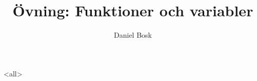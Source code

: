 \documentclass[ignoreframetext]{beamer}
\begin{document}
\title{%
  Övning: Funktioner och variabler
}
\author{Daniel Bosk}

\begin{frame}
  \maketitle
\end{frame}

\mode<all>

\mode*
%
\end{document}
